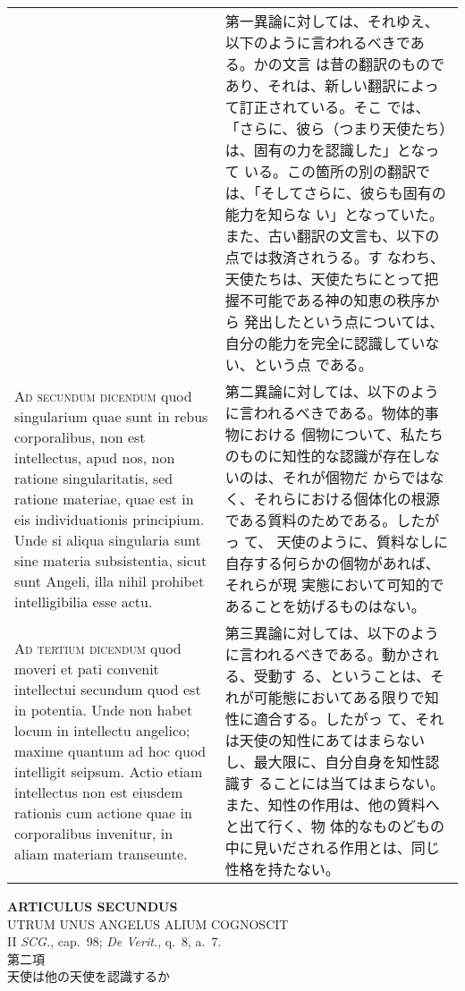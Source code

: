 \documentclass[10pt]{jsarticle} %
\begin{document}
\begin{longtable}{p{21em}p{21em}}
&

第一異論に対しては、それゆえ、以下のように言われるべきである。かの文言
は昔の翻訳のものであり、それは、新しい翻訳によって訂正されている。そこ
では、「さらに、彼ら（つまり天使たち）は、固有の力を認識した」となって
いる。この箇所の別の翻訳では、「そしてさらに、彼らも固有の能力を知らな
い」となっていた。また、古い翻訳の文言も、以下の点では救済されうる。す
なわち、天使たちは、天使たちにとって把握不可能である神の知恵の秩序から
発出したという点については、自分の能力を完全に認識していない、という点
である。


\\


{\scshape Ad secundum dicendum} quod singularium quae sunt in rebus
corporalibus, non est intellectus, apud nos, non ratione
singularitatis, sed ratione materiae, quae est in eis individuationis
principium. Unde si aliqua singularia sunt sine materia subsistentia,
sicut sunt Angeli, illa nihil prohibet intelligibilia esse actu.


&

第二異論に対しては、以下のように言われるべきである。物体的事物における
個物について、私たちのものに知性的な認識が存在しないのは、それが個物だ
からではなく、それらにおける個体化の根源である質料のためである。したがっ
て、 天使のように、質料なしに自存する何らかの個物があれば、それらが現
実態において可知的であることを妨げるものはない。

\\


{\scshape Ad tertium dicendum} quod moveri et pati convenit
intellectui secundum quod est in potentia. Unde non habet locum in
intellectu angelico; maxime quantum ad hoc quod intelligit
seipsum. Actio etiam intellectus non est eiusdem rationis cum actione
quae in corporalibus invenitur, in aliam materiam transeunte.


&

第三異論に対しては、以下のように言われるべきである。動かされる、受動す
る、ということは、それが可能態においてある限りで知性に適合する。したがっ
て、それは天使の知性にあてはまらないし、最大限に、自分自身を知性認識す
ることには当てはまらない。また、知性の作用は、他の質料へと出て行く、物
体的なものどもの中に見いだされる作用とは、同じ性格を持たない。



\end{longtable}
\newpage



\begin{center}
{\Large {\bf ARTICULUS SECUNDUS}}\\ {\large UTRUM UNUS ANGELUS ALIUM
COGNOSCIT}\\ {\footnotesize II {\itshape SCG.}, cap.~98; {\itshape De
Verit.}, q.~8, a.~7.}\\ {\Large 第二項\\天使は他の天使を認識するか}
\end{center}
\end{document}
